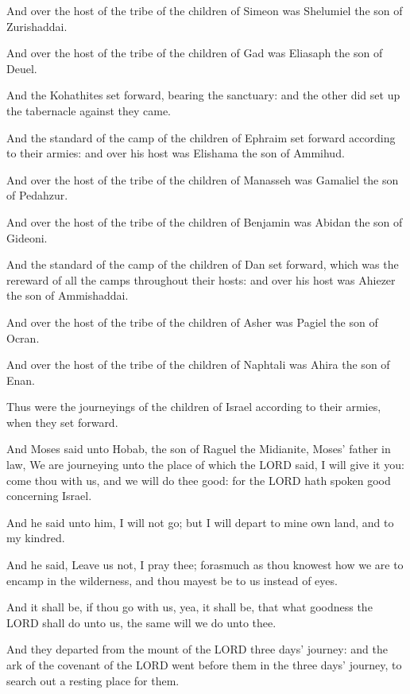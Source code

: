 \Verse And over the host of the tribe of the children of Simeon was
Shelumiel the son of Zurishaddai.

\Verse And over the host of the tribe of the children of Gad was
Eliasaph the son of Deuel.

\Verse And the Kohathites set forward, bearing the sanctuary: and the
other did set up the tabernacle against they came.

\Verse And the standard of the camp of the children of Ephraim set
forward according to their armies: and over his host was Elishama the
son of Ammihud.

\Verse And over the host of the tribe of the children of Manasseh was
Gamaliel the son of Pedahzur.

\Verse And over the host of the tribe of the children of Benjamin was
Abidan the son of Gideoni.

\Verse And the standard of the camp of the children of Dan set forward,
which was the rereward of all the camps throughout their hosts: and
over his host was Ahiezer the son of Ammishaddai.

\Verse And over the host of the tribe of the children of Asher was
Pagiel the son of Ocran.

\Verse And over the host of the tribe of the children of Naphtali was
Ahira the son of Enan.

\Verse Thus were the journeyings of the children of Israel according to
their armies, when they set forward.

\Verse And Moses said unto Hobab, the son of Raguel the Midianite,
Moses' father in law, We are journeying unto the place of which the
LORD said, I will give it you: come thou with us, and we will do thee
good: for the LORD hath spoken good concerning Israel.

\Verse And he said unto him, I will not go; but I will depart to mine
own land, and to my kindred.

\Verse And he said, Leave us not, I pray thee; forasmuch as thou
knowest how we are to encamp in the wilderness, and thou mayest be to
us instead of eyes.

\Verse And it shall be, if thou go with us, yea, it shall be, that what
goodness the LORD shall do unto us, the same will we do unto thee.

\Verse And they departed from the mount of the LORD three days'
journey: and the ark of the covenant of the LORD went before them in
the three days' journey, to search out a resting place for them.

